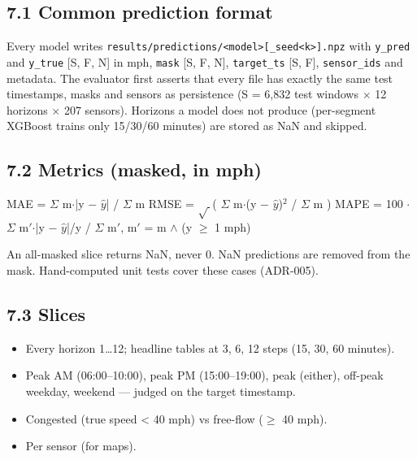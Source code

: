 \documentclass[10pt,a4paper]{article}
\begin{document}
\subsection*{7.1 Common prediction format}
Every model writes \texttt{results/\allowbreak{}predictions/\allowbreak{}<model>[\_\allowbreak{}seed<k>].npz} with \texttt{y\_\allowbreak{}pred} and \texttt{y\_\allowbreak{}true} [S, F, N] in mph, \texttt{mask} [S, F, N], \texttt{target\_\allowbreak{}ts} [S, F], \texttt{sensor\_\allowbreak{}ids} and metadata. The evaluator first asserts that every file has exactly the same test timestamps, masks and sensors as persistence (S = 6,832 test windows \ensuremath{\times} 12 horizons \ensuremath{\times} 207 sensors). Horizons a model does not produce (per-segment XGBoost trains only 15/\allowbreak{}30/\allowbreak{}60 minutes) are stored as NaN and skipped.

\subsection*{7.2 Metrics (masked, in mph)}
\begin{eqbox}MAE = \ensuremath{\Sigma} m\ensuremath{\cdot}|y \ensuremath{-} \ensuremath{\hat{y}}| /\allowbreak{} \ensuremath{\Sigma} m        RMSE = \ensuremath{\sqrt{\ }}( \ensuremath{\Sigma} m\ensuremath{\cdot}(y \ensuremath{-} \ensuremath{\hat{y}})\ensuremath{^{2}} /\allowbreak{} \ensuremath{\Sigma} m )        MAPE = 100 \ensuremath{\cdot} \ensuremath{\Sigma} m\ensuremath{'}\ensuremath{\cdot}|y \ensuremath{-} \ensuremath{\hat{y}}|/\allowbreak{}y /\allowbreak{} \ensuremath{\Sigma} m\ensuremath{'},   m\ensuremath{'} = m \ensuremath{\wedge} (y \ensuremath{\geq} 1 mph)\end{eqbox}

An all-masked slice returns NaN, never 0. NaN predictions are removed from the mask. Hand-computed unit tests cover these cases (ADR-005).

\subsection*{7.3 Slices}
\begin{itemize}[nosep,leftmargin=*]
\item Every horizon 1\ldots{}12; headline tables at 3, 6, 12 steps (15, 30, 60 minutes).
\item Peak AM (06:00--10:00), peak PM (15:00--19:00), peak (either), off-peak weekday, weekend --- judged on the target timestamp.
\item Congested (true speed < 40 mph) vs free-flow (\ensuremath{\geq} 40 mph).
\item Per sensor (for maps).
\end{itemize}
\end{document}
